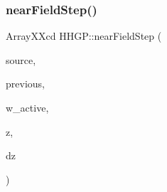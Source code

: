 \subsubsection{\texorpdfstring{near\+Field\+Step()}{nearFieldStep()}}
{\footnotesize\ttfamily Array\+X\+Xcd H\+H\+G\+P\+::near\+Field\+Step (\begin{DoxyParamCaption}\item[{Array\+X\+Xcd}]{source,  }\item[{Array\+X\+Xcd}]{previous,  }\item[{Array\+Xd}]{w\+\_\+active,  }\item[{double}]{z,  }\item[{double}]{dz }\end{DoxyParamCaption})}

